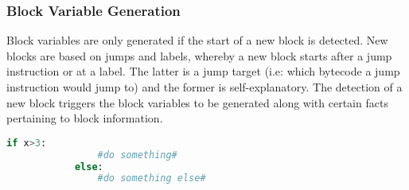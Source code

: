         \subsubsection*{Block Variable Generation}
        \par Block variables are only generated if the start of a new block is detected. New blocks are based on jumps and labels, whereby a new block starts after a jump instruction or at a label. The latter is a jump target (i.e: which bytecode a jump instruction would jump to) and the former is self-explanatory. 
        The detection of a new block triggers the block variables to be generated along with certain facts pertaining to block information.    
        

        \begin{lstlisting}[float=h,language=Python,caption= Conditional statement script,label=lst:condscriptLIst]
            if x>3:
                #do something#
            else:
                #do something else#
        \end{lstlisting}


